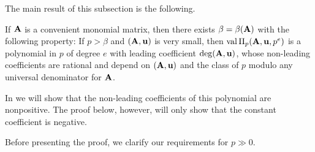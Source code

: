 \documentclass{article}
\begin{document}
The main result of this subsection is the following.

\begin{theorem}
   \label{m-primary AIP: T}
   If $\mathbf{A}$ is a convenient monomial matrix, then there exists $\beta=\beta(\mathbf{A})$ with the following property\textup:
   If $p > \beta$ and $(\mathbf{A},\mathbf{u})$ is very small, then $\operatorname{val} \Pi_p(\mathbf{A},\mathbf{u},p^e)$ is a polynomial in $p$ of degree $e$ with leading coefficient $\operatorname{deg}(\mathbf{A},\mathbf{u})$, whose non-leading coefficients are rational and depend on $(\mathbf{A},\mathbf{u})$ and the class of $p$ modulo any universal denominator for $\mathbf{A}$.
\end{theorem}

\begin{remark}
   In  we will show that the non-leading coefficients of this polynomial are nonpositive.
   The proof below, however, will only show that the constant coefficient is negative.
\end{remark}

Before presenting the proof, we clarify our requirements for $p\gg 0$.
\end{document}
